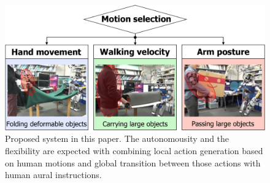 \begin{figure}[htbp]
 \begin{center}
  \includegraphics[width=1.00\columnwidth]{figs/approach}
  \caption{Proposed system in this paper. The autonomousity and the flexibility are expected with combining local action generation based on human motions and global transition between those actions with human aural instructions.}
  \label{figure:system}
 \end{center}
 \vspace{-5mm}
\end{figure}

